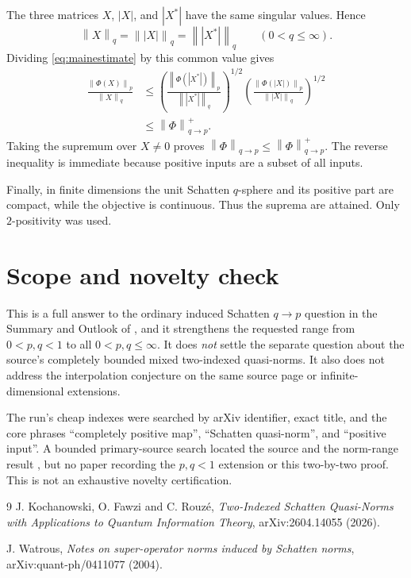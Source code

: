 \documentclass[11pt]{article}
\newcommand{\norm}[1]{\left\lVert #1\right\rVert}
\begin{document}
The three matrices $X$, $|X|$, and $|X^*|$ have the same singular values.
Hence
\[
             \norm{X}_q=\norm{|X|}_q=\norm{|X^*|}_q
             \qquad(0<q\leq\infty).
\]
Dividing \eqref{eq:mainestimate} by this common value gives
\begin{align*}
 \frac{\norm{\Phi(X)}_p}{\norm{X}_q}
 &\leq
 \left(
  \frac{\norm{\Phi(|X^*|)}_p}{\norm{|X^*|}_q}
 \right)^{1/2}
 \left(
  \frac{\norm{\Phi(|X|)}_p}{\norm{|X|}_q}
 \right)^{1/2}\\
 &\leq \norm{\Phi}^{+}_{q\to p}.
\end{align*}
Taking the supremum over $X\ne0$ proves
$\norm{\Phi}_{q\to p}\leq\norm{\Phi}^{+}_{q\to p}$.  The reverse
inequality is immediate because positive inputs are a subset of all inputs.

Finally, in finite dimensions the unit Schatten $q$-sphere and its positive
part are compact, while the objective is continuous.  Thus the suprema are
attained.  Only $2$-positivity was used.

\section{Scope and novelty check}

This is a full answer to the ordinary induced Schatten $q\to p$ question in
the Summary and Outlook of \cite{KFR}, and it strengthens the requested range
from $0<p,q<1$ to all $0<p,q\leq\infty$.  It does \emph{not} settle the
separate question about the source's completely bounded mixed two-indexed
quasi-norms.  It also does not address the interpolation conjecture on the
same source page or infinite-dimensional extensions.

The run's cheap indexes were searched by arXiv identifier, exact title, and
the core phrases ``completely positive map'', ``Schatten quasi-norm'', and
``positive input''.  A bounded primary-source search located the source and
the norm-range result \cite{Watrous}, but no paper recording the $p,q<1$
extension or this two-by-two proof.  This is not an exhaustive novelty
certification.

\begin{thebibliography}{9}
J. Kochanowski, O. Fawzi and C. Rouz\'e,
\emph{Two-Indexed Schatten Quasi-Norms with Applications to Quantum
Information Theory}, arXiv:2604.14055 (2026).

J. Watrous,
\emph{Notes on super-operator norms induced by Schatten norms},
arXiv:quant-ph/0411077 (2004).
\end{thebibliography}
\end{document}
